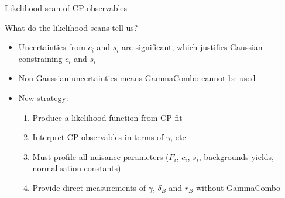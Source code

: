 \documentclass[xcolor={dvipsnames}]{beamer}
\begin{document}
\begin{frame}{Likelihood scan of CP observables}
  \begin{center}
    {\large What do the likelihood scans tell us?}
  \end{center}
  \begin{itemize}
    \setlength\itemsep{1.5em}
    \item{Uncertainties from $c_i$ and $s_i$ are significant, which justifies Gaussian constraining $c_i$ and $s_i$}
    \item{Non-Gaussian uncertainties means GammaCombo cannot be used}
    \item{New strategy:}
    \begin{enumerate}
      \setlength\itemsep{0.5em}
      \item{Produce a likelihood function from CP fit}
      \item{Interpret CP observables in terms of $\gamma$, etc}
      \item{Must \underline{profile} all nuisance parameters ($F_i$, $c_i$, $s_i$, backgrounds yields, normalisation constants)}
      \item{Provide direct measurements of $\gamma$, $\delta_B$ and $r_B$ without GammaCombo}
    \end{enumerate}
  \end{itemize}
\end{frame}
\end{document}
